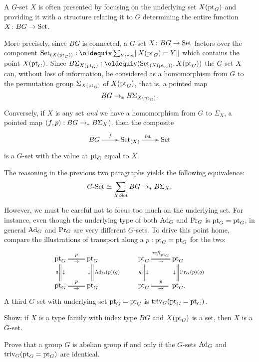 \begin{remark}
  \label{remark:GsetsareGsets}
  A $G$-set $X$ is often presented by focusing on the underlying set $X(\mathrm{pt}_G)$ 
and providing it with a structure relating it to $G$ determining 
the entire function $X\colon BG\to\mathord{\mathrm{Set}}$.

More precisely, since $BG$ is connected, a $G$-set $X\colon BG\to\mathord{\mathrm{Set}}$ factors 
over the component $\Set_{(X(\pt_G))}\defequi\sum_{Y:\Set}\Trunc{X(\pt_G)=Y}$ 
which contains the point $X(\mathrm{pt}_G)$.  
Since $B\Sigma_{X(\pt_G)}\defequi(\Set_{(X(\pt_G))},X(\pt_G))$ the $G$-set $X$ can, 
without loss of information, be considered as a homomorphism from $G$ to 
the permutation group $\Sigma_{X(\mathrm{pt}_G)}$ of $X(\mathrm{pt}_G)$,
that is, a pointed map 
$$BG\to_\ast B\Sigma_{X(\mathrm{pt}_G)}.$$ 

Conversely, if $X$ is any set \emph{and} we have a homomorphism 
from $G$ to $\Sigma_X$, \ie a pointed map $(f,p) : BG\to_\ast B\Sigma_{X}$), 
then the composite
$$\xymatrix{BG\ar[r]^-{f}&\Set_{(X)}\ar[r]^{\fst}&\Set}$$
is a $G$-set with the value at $\mathrm{pt}_G$ equal to $X$.

The reasoning in the previous two paragraphs yields the following equivalence:
\[
\mathord{G\text{-}\mathrm{Set}} \simeq \sum_{X:\mathord{\mathrm{Set}}} BG \to_\ast B\Sigma_X.
\]

However, we must be careful not to focus too much on the underlying set.  
For instance, even though the underlying type of both $\mathrm{Ad}_G$ and $\mathrm{Pr}_{{G}}$ is $\mathrm{pt}_G=\mathrm{pt}_G$, in general  $\mathrm{Ad}_G$ and $\mathrm{Pr}_{{G}}$  are very different $G$-sets.  
To drive this point home, compare the illustrations of transport along a $p:\mathrm{pt}_G=\mathrm{pt}_G$ for the two:
$$\xymatrix{\pt_G\ar@{=}[r]^p_\to\ar@{=}[d]_q^\downarrow&\pt_G\ar@{=}[d]^{\Ad_G(p)(q)}_\downarrow\\
\pt_G\ar@{=}[r]^p_\to&\pt_G}                 \qquad
\xymatrix{\pt_G\ar@{=}[r]^{\refl{\pt_G}}_\to\ar@{=}[d]_q^\downarrow&\pt_G\ar@{=}[d]^{\princ G(p)(q)}_\downarrow\\
\pt_G\ar@{=}[r]^p_\to&{\hphantom{.}}\pt_G.}$$
A third $G$-set with underlying set $\mathrm{pt}_G=\mathrm{pt}_G$ is $\mathrm{triv}_G(\mathrm{pt}_G=\mathrm{pt}_G)$.
\end{remark}

\begin{xca}
Show:  if $X$ is a type family with index type $BG$ and $X(\mathrm{pt}_G)$ is a set, 
then $X$ is a $G$-set.
\end{xca}

\begin{xca}
  Prove that a group $G$ is abelian group if and only if the $G$-sets $\mathrm{Ad}_G$ and $\mathrm{triv}_G(\mathrm{pt}_G=\mathrm{pt}_G)$ are identical.
\end{xca}

